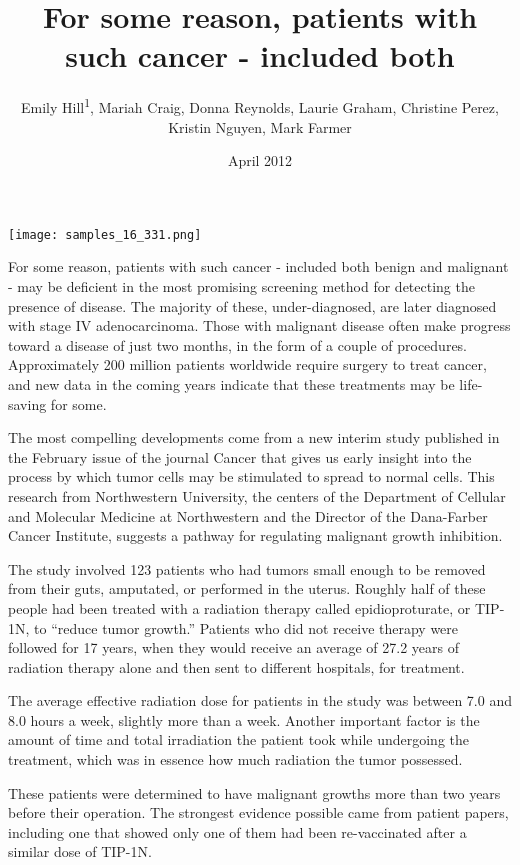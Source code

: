 \documentclass{article}
\title{For some reason, patients with such cancer - included both}
\author{Emily Hill\textsuperscript{1},  Mariah Craig,  Donna Reynolds,  Laurie Graham,  Christine Perez,  Kristin Nguyen,  Mark Farmer}
\affil{\textsuperscript{1}Peking University School of Oncology}
\date{April 2012}
\begin{document}
\maketitle

\begin{center}
\begin{minipage}{0.75\linewidth}
\texttt{[image: samples\_16\_331.png]}
\end{minipage}
\end{center}

For some reason, patients with such cancer - included both benign and malignant - may be deficient in the most promising screening method for detecting the presence of disease. The majority of these, under-diagnosed, are later diagnosed with stage IV adenocarcinoma. Those with malignant disease often make progress toward a disease of just two months, in the form of a couple of procedures. Approximately 200 million patients worldwide require surgery to treat cancer, and new data in the coming years indicate that these treatments may be life-saving for some.

The most compelling developments come from a new interim study published in the February issue of the journal Cancer that gives us early insight into the process by which tumor cells may be stimulated to spread to normal cells. This research from Northwestern University, the centers of the Department of Cellular and Molecular Medicine at Northwestern and the Director of the Dana-Farber Cancer Institute, suggests a pathway for regulating malignant growth inhibition.

The study involved 123 patients who had tumors small enough to be removed from their guts, amputated, or performed in the uterus. Roughly half of these people had been treated with a radiation therapy called epidioproturate, or TIP-1N, to “reduce tumor growth.” Patients who did not receive therapy were followed for 17 years, when they would receive an average of 27.2 years of radiation therapy alone and then sent to different hospitals, for treatment.

The average effective radiation dose for patients in the study was between 7.0 and 8.0 hours a week, slightly more than a week. Another important factor is the amount of time and total irradiation the patient took while undergoing the treatment, which was in essence how much radiation the tumor possessed.

These patients were determined to have malignant growths more than two years before their operation. The strongest evidence possible came from patient papers, including one that showed only one of them had been re-vaccinated after a similar dose of TIP-1N.
\end{document}
